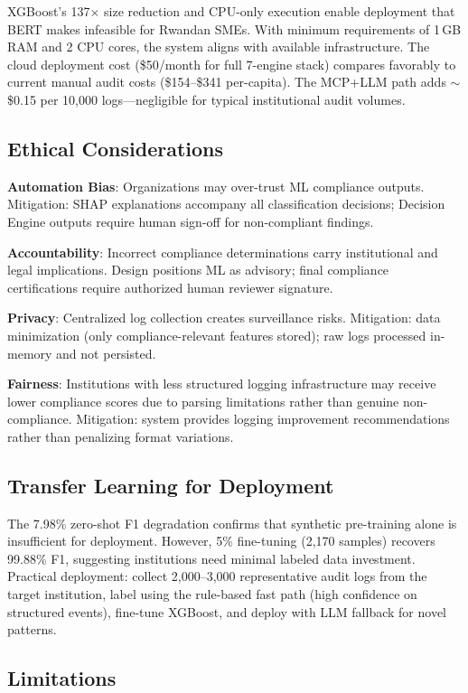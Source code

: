 \documentclass[11pt,conference]{IEEEtran}
\begin{document}
XGBoost's 137$\times$ size reduction and CPU-only execution enable deployment that BERT makes infeasible for Rwandan SMEs. With minimum requirements of 1\,GB RAM and 2 CPU cores, the system aligns with available infrastructure. The cloud deployment cost (\$50/month for full 7-engine stack) compares favorably to current manual audit costs (\$154--\$341 per-capita). The MCP+LLM path adds $\sim$\$0.15 per 10,000 logs---negligible for typical institutional audit volumes.

\subsection{Ethical Considerations}

\textbf{Automation Bias}: Organizations may over-trust ML compliance outputs. Mitigation: SHAP explanations accompany all classification decisions; Decision Engine outputs require human sign-off for non-compliant findings.

\textbf{Accountability}: Incorrect compliance determinations carry institutional and legal implications. Design positions ML as advisory; final compliance certifications require authorized human reviewer signature.

\textbf{Privacy}: Centralized log collection creates surveillance risks. Mitigation: data minimization (only compliance-relevant features stored); raw logs processed in-memory and not persisted.

\textbf{Fairness}: Institutions with less structured logging infrastructure may receive lower compliance scores due to parsing limitations rather than genuine non-compliance. Mitigation: system provides logging improvement recommendations rather than penalizing format variations.

\subsection{Transfer Learning for Deployment}

The 7.98\% zero-shot F1 degradation confirms that synthetic pre-training alone is insufficient for deployment. However, 5\% fine-tuning (2,170 samples) recovers 99.88\% F1, suggesting institutions need minimal labeled data investment. Practical deployment: collect 2,000--3,000 representative audit logs from the target institution, label using the rule-based fast path (high confidence on structured events), fine-tune XGBoost, and deploy with LLM fallback for novel patterns.

\subsection{Limitations}
\end{document}
